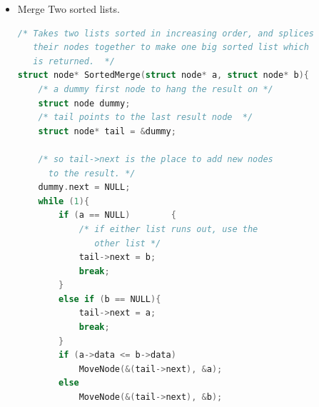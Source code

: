 \documentclass[a4paper,11pt,twoside]{book}
\begin{document}
\begin{itemize}
\begin{lstlisting}[frame=single, language=c++]
  /* Pick either a or b, and recur */
  if (a->data <= b->data){
     result = a;
     result->next = SortedMerge(a->next, b);
  }
  else{
     result = b;
     result->next = SortedMerge(a, b->next);
  }
  return(result);
}
 \end{lstlisting}
\begin{description}
	\item[Source code:] \textbf{Idea: recursive}
\end{description}
 
 \begin{lstlisting}[frame=single, language=c++] 
/* UTILITY FUNCTIONS */
/* Split the nodes of the given list into front and back halves,
     and return the two lists using the reference parameters.
     If the length is odd, the extra node should go in the front list.
     Uses the fast/slow pointer strategy.  */
void FrontBackSplit(struct node* source,
          struct node** frontRef, struct node** backRef)
{
  struct node* fast;
  struct node* slow;
  if (source==NULL || source->next==NULL)
  {
    /* length < 2 cases */
    *frontRef = source;
    *backRef = NULL;
  }
  else
  {
    slow = source;
    fast = source->next;
 
    /* Advance 'fast' two nodes, and advance 'slow' one node */
    while (fast != NULL)
    {
      fast = fast->next;
      if (fast != NULL)
      {
        slow = slow->next;
        fast = fast->next;
      }
    }
 
    /* 'slow' is before the midpoint in the list, so split it in two
      at that point. */
    *frontRef = source;
    *backRef = slow->next;
    slow->next = NULL;
  }
}

\end{lstlisting}

	\item Merge Two sorted lists.
\begin{lstlisting}[frame=single, language=c++]
/* Takes two lists sorted in increasing order, and splices
   their nodes together to make one big sorted list which
   is returned.  */
struct node* SortedMerge(struct node* a, struct node* b){
    /* a dummy first node to hang the result on */
    struct node dummy;
    /* tail points to the last result node  */
    struct node* tail = &dummy;

    /* so tail->next is the place to add new nodes
      to the result. */
    dummy.next = NULL;
    while (1){
        if (a == NULL)        {
            /* if either list runs out, use the
               other list */
            tail->next = b;
            break;
        }
        else if (b == NULL){
            tail->next = a;
            break;
        }
        if (a->data <= b->data)
            MoveNode(&(tail->next), &a);
        else
            MoveNode(&(tail->next), &b);
 

\end{lstlisting}
\end{itemize}
\end{document}
